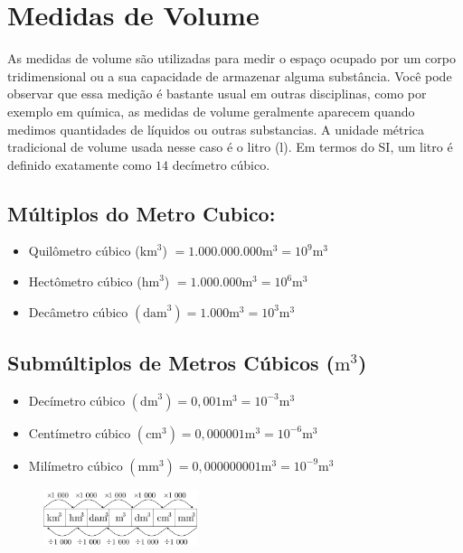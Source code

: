 \section{Medidas de Volume} 
As medidas de volume são utilizadas para medir o espaço ocupado por um corpo tridimensional ou a sua capacidade de armazenar alguma substância. Você pode observar que essa medição é bastante usual em outras disciplinas, como por exemplo em química, as medidas de volume geralmente aparecem quando medimos quantidades de líquidos ou outras substancias. A unidade métrica tradicional de volume usada nesse caso é o litro ($\mathrm{l}$). Em termos
do SI, um litro é definido exatamente como $14$ decímetro cúbico.
\subsection{Múltiplos do Metro Cubico:}
		\begin{itemize}
		    \item Quilômetro cúbico ($\mathrm{km}^3$) $= 1.000.000.000 \mathrm{m}^3 = 10^9 \mathrm{m}^3$
		    \item Hectômetro cúbico ($\mathrm{hm}^3$) $= 1.000.000 \mathrm{m}^3 = 10^6 \mathrm{m}^3$
		    \item Decâmetro cúbico $(\mathrm{dam}^3) = 1.000 \mathrm{m}^3 = 10^3 \mathrm{m}^3$
		\end{itemize}
	
\subsection{Submúltiplos de Metros Cúbicos ($\mathrm{m}^3$)}
		\begin{itemize}
		    \item Decímetro cúbico $(\mathrm{dm}^3) = 0,001 \mathrm{m}^3 = 10^{-3} \mathrm{m}^3$
		    \item Centímetro cúbico $(\mathrm{cm}^3) = 0,000001 \mathrm{m}^3 = 10^{-6} \mathrm{m}^3$
		    \item Milímetro cúbico $(\mathrm{mm}^3) = 0,000000001 \mathrm{m}^3 = 10^{-9} \mathrm{m}^3$
		\end{itemize}
		
		\begin{figure}[!h]
		    \centering 
            \includegraphics[width=0.4\textwidth]{imagens/matematicaBasica/sistemaDeUnidades/MultiplosDeMetroCubico.pdf}
		\end{figure}
     
